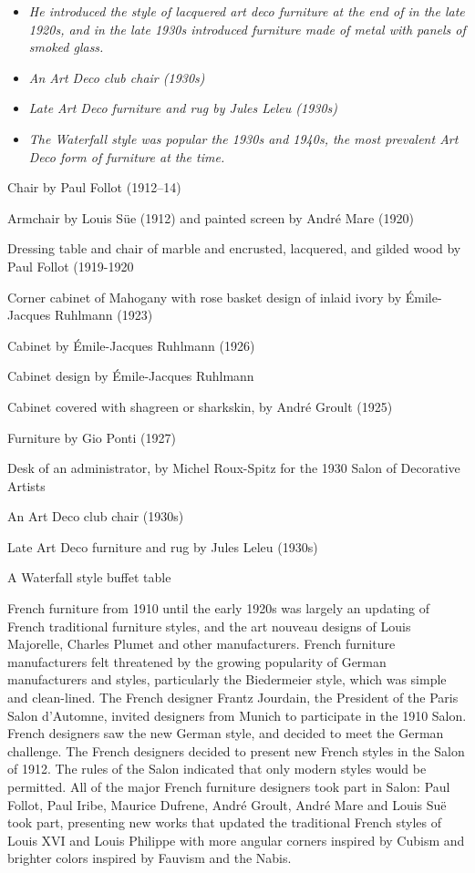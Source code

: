 \begin{itemize}
\item
  \emph{He introduced the style of lacquered art deco furniture at the
  end of in the late 1920s, and in the late 1930s introduced furniture
  made of metal with panels of smoked glass.}
\item
  \emph{An Art Deco club chair (1930s)}
\item
  \emph{Late Art Deco furniture and rug by Jules Leleu (1930s)}
\item
  \emph{The Waterfall style was popular the 1930s and 1940s, the most
  prevalent Art Deco form of furniture at the time.}
\end{itemize}

Chair by Paul Follot (1912--14)

Armchair by Louis Süe (1912) and painted screen by André Mare (1920)

Dressing table and chair of marble and encrusted, lacquered, and gilded
wood by Paul Follot (1919-1920

Corner cabinet of Mahogany with rose basket design of inlaid ivory by
Émile-Jacques Ruhlmann (1923)

Cabinet by Émile-Jacques Ruhlmann (1926)

Cabinet design by Émile-Jacques Ruhlmann

Cabinet covered with shagreen or sharkskin, by André Groult (1925)

Furniture by Gio Ponti (1927)

Desk of an administrator, by Michel Roux-Spitz for the 1930 Salon of
Decorative Artists

An Art Deco club chair (1930s)

Late Art Deco furniture and rug by Jules Leleu (1930s)

A Waterfall style buffet table

French furniture from 1910 until the early 1920s was largely an updating
of French traditional furniture styles, and the art nouveau designs of
Louis Majorelle, Charles Plumet and other manufacturers. French
furniture manufacturers felt threatened by the growing popularity of
German manufacturers and styles, particularly the Biedermeier style,
which was simple and clean-lined. The French designer Frantz Jourdain,
the President of the Paris Salon d'Automne, invited designers from
Munich to participate in the 1910 Salon. French designers saw the new
German style, and decided to meet the German challenge. The French
designers decided to present new French styles in the Salon of 1912. The
rules of the Salon indicated that only modern styles would be permitted.
All of the major French furniture designers took part in Salon: Paul
Follot, Paul Iribe, Maurice Dufrene, André Groult, André Mare and Louis
Suë took part, presenting new works that updated the traditional French
styles of Louis XVI and Louis Philippe with more angular corners
inspired by Cubism and brighter colors inspired by Fauvism and the
Nabis.

